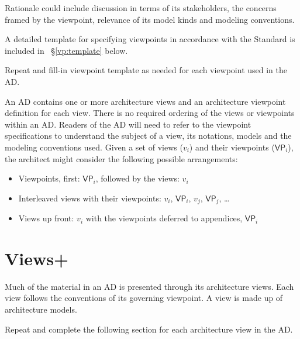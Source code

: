 \documentclass[10pt,oneside]{report}
\begin{document}
Rationale could include discussion in terms of its stakeholders, the
concerns framed by the viewpoint, relevance of its model kinds and
modeling conventions.


A detailed template for specifying viewpoints in accordance with the
Standard is included in ~\S\ref{vp:template} below.


Repeat and fill-in viewpoint template as needed for each viewpoint
used in the AD.


An AD contains one or more architecture views and an architecture
viewpoint definition for each view. There is no required ordering of
the views or viewpoints within an AD.  Readers of the AD will need to
refer to the viewpoint specifications to understand the subject of a
view, its notations, models and the modeling conventions used.  Given
a set of views ($v_i$) and their viewpoints ($\mathsf{VP}_i$), the
architect might consider the following possible arrangements:

\begin{itemize}
\item Viewpoints, first: $\mathsf{VP}_i$, followed by the views: $v_i$
\item Interleaved views with their viewpoints: $v_i$, $\mathsf{VP}_i$,
  $v_j$, $\mathsf{VP}_j$, \ldots
\item Views up front: $v_i$ with the viewpoints deferred to
  appendices, $\mathsf{VP}_i$
\end{itemize}





\chapter{Views+}

Much of the material in an AD is presented through its architecture views.
Each view follows the conventions of its governing viewpoint.
A view is made up of architecture models.


Repeat and complete the following section for each architecture view
in the AD.
\end{document}
